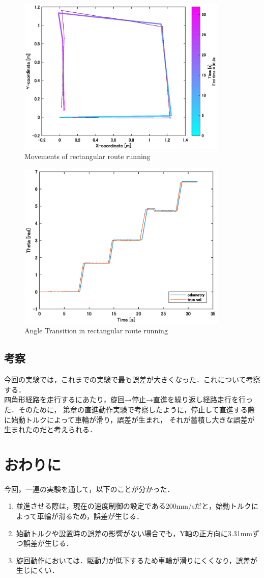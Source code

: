 \documentclass[a4paper,11pt]{jsarticle}
\begin{document}
\begin{figure}[H]\centering
\includegraphics[width=100mm]{figure/4_1.eps}
\caption{Movements of rectangular route running}
\label{ex4_1}\vspace{0zh}\end{figure}

\begin{figure}[H]\centering
\includegraphics[width=100mm]{figure/4_2.eps}
\caption{Angle Transition in rectangular route running}
\label{ex4_2}\vspace{0zh}\end{figure}

\subsection{考察}
今回の実験では，これまでの実験で最も誤差が大きくなった．これについて考察する．\\
四角形経路を走行するにあたり，旋回→停止→直進を繰り返し経路走行を行った．そのために，
第章の直進動作実験で考察したように，停止して直進する際に始動トルクによって車輪が滑り，誤差が生まれ，
それが蓄積し大きな誤差が生まれたのだと考えられる．

\newpage

\section{おわりに}
今回，一連の実験を通して，以下のことが分かった．
\begin{enumerate}
\item 並進させる際は，現在の速度制御の設定である200mm/sだと，始動トルクによって車輪が滑るため，誤差が生じる．
\item 始動トルクや設置時の誤差の影響がない場合でも，Y軸の正方向に3.31mmずつ誤差が生じる．
\item 旋回動作においては．駆動力が低下するため車輪が滑りにくくなり，誤差が生じにくい．
\end{enumerate}
\end{document}
